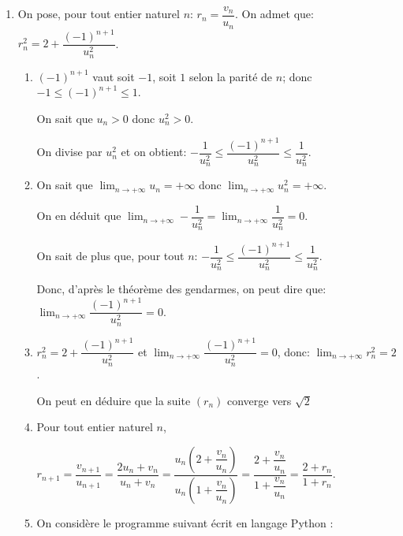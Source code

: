 \documentclass[10pt]{article}
\providecommand{\ds}{\displaystyle}
\begin{document}
\begin{enumerate}
\begin{enumerate}
	\end{enumerate}
	\item On pose, pour tout entier naturel $n$: $r_n = \dfrac{v_n}{u_n}.$
On admet que: $r_n^2 = 2 + \dfrac{(- 1)^{n+1}}{u_n^2}$.

	\begin{enumerate}
		\item 
$(-1)^{n+1}$ vaut soit $-1$, soit $1$ selon la parité de $n$; donc $-1\leqslant (-1)^{n+1} \leqslant 1$.

On sait que $u_n>0$ donc $u_n^2>0$.

On divise par $u_n^2$ et on obtient:
$- \dfrac{1}{u_n^2} \leqslant \dfrac{(- 1)^{n+1}}{u_n^2} \leqslant \dfrac{1}{u_n^2}.$

		\item
On sait que $\ds\lim_{n\to +\infty} u_n=+\infty$ donc $\ds\lim_{n\to +\infty} u_n^2=+\infty$. 

On en déduit que $\ds\lim_{n\to +\infty} -\dfrac{1}{u_n^2} = \ds\lim_{n\to +\infty} \dfrac{1}{u_n^2} = 0$.

On sait de plus que, pour tout $n$:  $- \dfrac{1}{u_n^2} \leqslant \dfrac{(- 1)^{n+1}}{u_n^2} \leqslant \dfrac{1}{u_n^2}$.
		
Donc, d'après le théorème des gendarmes, on peut dire que:
$\displaystyle\lim_{n \to + \infty} \dfrac{(- 1)^{n+1}}{u_n^2}=0$.

		\item 
$r_n^2 = 2 + \dfrac{(- 1)^{n+1}}{u_n^2}$ et $\displaystyle\lim_{n \to + \infty} \dfrac{(- 1)^{n+1}}{u_n^2}=0$, donc: $\ds\lim_{n \to +\infty} r_n^2=2$.

On peut en déduire que la suite $(r_n)$ converge vers $\sqrt{2}$
		
		\item  Pour tout entier naturel $n$,
		
$r_{n+1}=\dfrac{v_{n+1}}{u_{n+1}} = \dfrac{2u_n + v_n}{u_n+v_n}
=\dfrac{u_n\left (2+\dfrac{v_n}{u_n}\right )}{u_n \left ( 1+\dfrac{v_n}{u_n}\right )}		
=\dfrac{2+\dfrac{v_n}{u_n}}{ 1+\dfrac{v_n}{u_n}}		
 = \dfrac{2 + r_n}{1 + r_n}$.

		\item On considère le programme suivant écrit en langage Python :
		
\begin{center}
\end{center}






\end{enumerate}
\end{enumerate}
\end{document}
